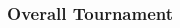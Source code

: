 \begin{CJK}{UTF8}{gbsn}
       \subsubsection{Overall Tournament\label{app8:prediction2aOverall}}




         



\end{CJK}
